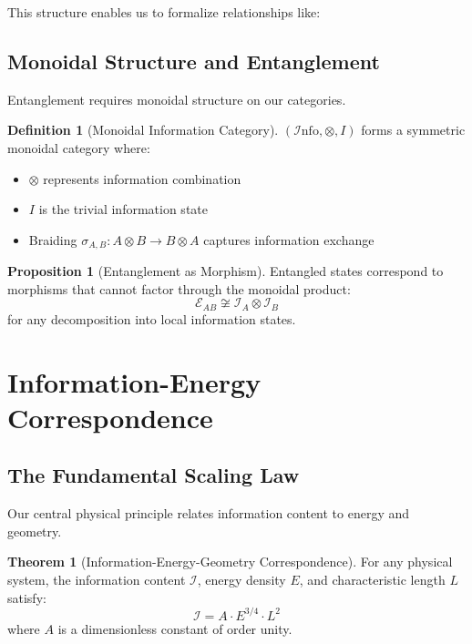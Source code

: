 \documentclass[11pt,a4paper]{article}
\theoremstyle{definition}
\newtheorem{definition}{Definition}[section]
\newtheorem{theorem}{Theorem}[section]
\newtheorem{proposition}{Proposition}[section]
\newcommand{\Info}{\mathcal{I}\text{nfo}}
\begin{document}
This structure enables us to formalize relationships like:
\begin{center}
\end{center}

\subsection{Monoidal Structure and Entanglement}

Entanglement requires monoidal structure on our categories.

\begin{definition}[Monoidal Information Category]
$(\Info, \otimes, I)$ forms a symmetric monoidal category where:
\begin{itemize}
\item $\otimes$ represents information combination
\item $I$ is the trivial information state
\item Braiding $\sigma_{A,B}: A \otimes B \to B \otimes A$ captures information exchange
\end{itemize}
\end{definition}

\begin{proposition}[Entanglement as Morphism]
Entangled states correspond to morphisms that cannot factor through the monoidal product:
\[\mathcal{E}_{AB} \not\cong \mathcal{I}_A \otimes \mathcal{I}_B\]
for any decomposition into local information states.
\end{proposition}

\section{Information-Energy Correspondence}

\subsection{The Fundamental Scaling Law}

Our central physical principle relates information content to energy and geometry.

\begin{theorem}[Information-Energy-Geometry Correspondence]
For any physical system, the information content $\mathcal{I}$, energy density $E$, and characteristic length $L$ satisfy:
\begin{equation}
\boxed{\mathcal{I} = A \cdot E^{3/4} \cdot L^2}
\end{equation}
where $A$ is a dimensionless constant of order unity.
\end{theorem}
\end{document}
